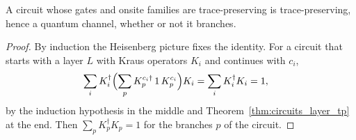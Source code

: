 \begin{theorem}
    \label{thm:circuits_tp}
    \leanok
    A circuit whose gates and onsite families are trace-preserving is
    trace-preserving, hence a quantum channel, whether or not it branches.
\end{theorem}
\begin{proof}\leanok
    By induction the Heisenberg picture fixes the identity. For a circuit that
    starts with a layer $L$ with Kraus operators $K_i$ and continues with $c_i$,
    \begin{align}
        \sum_iK_i^\dagger\Bigl(\sum_pK^{c_i\dagger}_p\,1\,K^{c_i}_p\Bigr)K_i
        &=\sum_iK_i^\dagger K_i=1,
        \notag
    \end{align}
    by the induction hypothesis in the middle and Theorem~\ref{thm:circuits_layer_tp}
    at the end. Then $\sum_pK_p^\dagger K_p=1$ for the branches $p$ of the
    circuit.
\end{proof}

